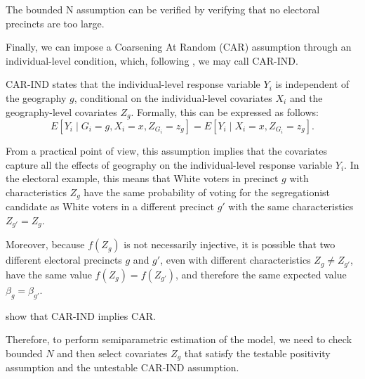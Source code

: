 The bounded N assumption can be verified by verifying that no electoral precincts are too large.

Finally, we can impose a Coarsening At Random (CAR) assumption through an individual-level condition, which, following \citet{mccartan2025identificationsemiparametricestimationconditional}, we may call CAR-IND.

CAR-IND states that the individual-level response variable $Y_i$ is independent of the geography $g$, conditional on the individual-level covariates $X_i$ and the geography-level covariates $Z_g$. Formally, this can be expressed as follows:
\[
E[Y_i \mid G_i = g, X_i = x, Z_{G_i} = z_g] = E[Y_i \mid X_i = x, Z_{G_i} = z_g].
\]

From a practical point of view, this assumption implies that the covariates capture all the effects of geography on the individual-level response variable $Y_i$. In the electoral example, this means that White voters in precinct $g$ with characteristics $Z_g$ have the same probability of voting for the segregationist candidate as White voters in a different precinct $g'$ with the same characteristics $Z_{g'} = Z_g$.

Moreover, because $f(Z_g)$ is not necessarily injective, it is possible that two different electoral precincts $g$ and $g'$, even with different characteristics $Z_g \neq Z_{g'}$, have the same value $f(Z_g) = f(Z_{g'})$, and therefore the same expected value $\beta_g = \beta_{g'}$.

\citet{mccartan2025identificationsemiparametricestimationconditional} show that CAR-IND implies CAR.

Therefore, to perform semiparametric estimation of the model, we need to check bounded $N$ and then select covariates $Z_g$ that satisfy the testable positivity assumption and the untestable CAR-IND assumption.